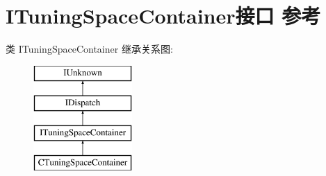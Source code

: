 \hypertarget{interface_i_tuning_space_container}{}\section{I\+Tuning\+Space\+Container接口 参考}
\label{interface_i_tuning_space_container}
类 I\+Tuning\+Space\+Container 继承关系图\+:\begin{figure}[H]
\begin{center}
\leavevmode
\includegraphics[height=4.000000cm]{interface_i_tuning_space_container}
\end{center}
\end{figure}
